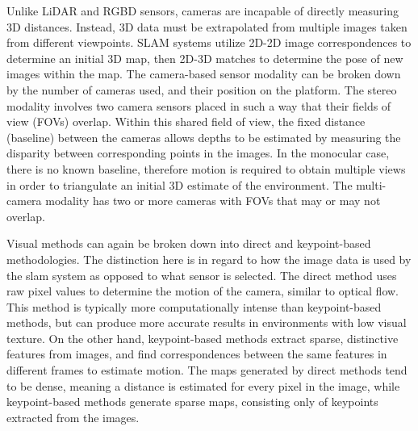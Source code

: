 Unlike LiDAR and RGBD sensors, cameras are incapable of directly measuring 3D distances. Instead, 3D data must be extrapolated from multiple images taken from different viewpoints. SLAM systems utilize 2D-2D image correspondences to determine an initial 3D map, then 2D-3D matches to determine the pose of new images within the map. The camera-based sensor modality can be broken down by the number of cameras used, and their position on the platform. The stereo modality involves two camera sensors placed in such a way that their fields of view (FOVs) overlap. Within this shared field of view, the fixed distance (baseline) between the cameras allows depths to be estimated by measuring the disparity between corresponding points in the images. In the monocular case, there is no known baseline, therefore motion is required to obtain multiple views in order to triangulate an initial 3D estimate of the environment. The multi-camera modality has two or more cameras with FOVs that may or may not overlap.

Visual methods can again be broken down into direct and keypoint-based methodologies. The distinction here is in regard to how the image data is used by the slam system as opposed to what sensor is selected. The direct method uses raw pixel values to determine the motion of the camera, similar to optical flow. This method is typically more computationally intense than keypoint-based methods, but can produce more accurate results in environments with low visual texture. On the other hand, keypoint-based methods extract sparse, distinctive features from images, and find correspondences between the same features in different frames to estimate motion. The maps generated by direct methods tend to be dense, meaning a distance is estimated for every pixel in the image, while keypoint-based methods generate sparse maps, consisting only of keypoints extracted from the images.

